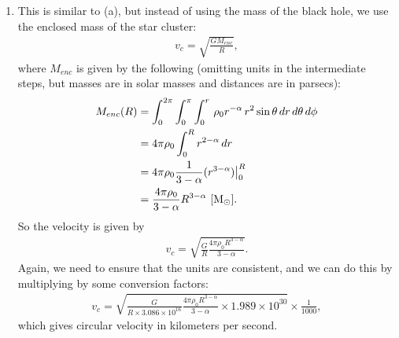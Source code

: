 \documentclass[11pt,letterpaper]{article}
\begin{document}
\begin{enumerate}[label=(\alph*)]
    \item This is similar to (a), but instead of using the mass of the black hole, we use the enclosed mass of the star cluster: 
        \begin{align*}
            v_c = \sqrt{\frac{GM_{enc}}{R}},
        \end{align*}
        where $M_{enc}$ is given by the following (omitting units in the intermediate steps, but masses are in solar masses and distances are in parsecs):
        \begin{align*}
            M_{enc}(R) &= \int_0^{2\pi}\int_0^{\pi}\int_0^{r}\,\rho_0 r^{-\alpha}\,r^2 \sin{\theta}\,dr\,d\theta\,d\phi \\
            &= 4\pi\rho_0 \int_0^R r^{2-\alpha}\,dr \\
            &= 4\pi\rho_0 \frac{1}{3-\alpha}(r^{3-\alpha})\big|_0^R \\
            &= \frac{4\pi\rho_0}{3-\alpha}R^{3-\alpha}~{\rm [M_\odot]}.
        \end{align*}
        So the velocity is given by 
        \begin{align*}
            v_c = \sqrt{\frac{G}{R}\frac{4\pi\rho_0 R^{3-\alpha}}{3-\alpha}}.
        \end{align*}
        Again, we need to ensure that the units are consistent, and we can do this by multiplying by some conversion factors:
        \begin{align*}
            v_c = \sqrt{\frac{G}{R\times 3.086\times 10^{16}}\frac{4\pi\rho_0 R^{3-\alpha}}{3-\alpha}\times 1.989\times 10^{30}} \times \frac{1}{1000},
        \end{align*}
        which gives circular velocity in kilometers per second.


\end{enumerate}
\end{document}
